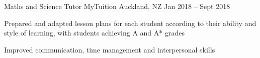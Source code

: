 \begin{cventries}
  \cventry
    {Maths and Science Tutor}
    {MyTuition}
    {Auckland, NZ}
    {Jan 2018 -- Sept 2018}
    {
      \begin{cvitems}
        \item Prepared and adapted lesson plans for each student according to their ability and style of learning, with students achieving A and A* grades
        \item Improved communication, time management and interpersonal skills
      \end{cvitems}
    }

\end{cventries}
